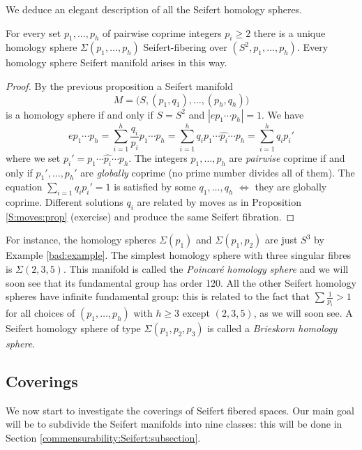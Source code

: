 We deduce an elegant description of all the Seifert homology spheres.

\begin{cor} \label{sigma:cor}
For every set $p_1, \ldots, p_h$ of pairwise coprime integers $p_i\geqslant 2$ there is a unique homology sphere $\Sigma(p_1,\ldots, p_h)$ Seifert-fibering over $(S^2,p_1,\ldots,p_h)$. Every homology sphere Seifert manifold arises in this way.
\end{cor}
\begin{proof}
By the previous proposition a Seifert manifold 
$$M=\big(S,(p_1,q_1), \ldots, (p_h,q_h)\big)$$
is a homology sphere if and only if $S=S^2$ and $|ep_1\cdots p_h|=1$. We have
$$ep_1\cdots p_h = \sum_{i=1}^h \frac{q_i}{p_i}p_1\cdots p_h = \sum_{i=1}^h q_ip_1\cdots \widehat {p_i}\cdots p_h = \sum_{i=1}^h q_ip_i'$$
where we set $p_i' = p_1\cdots \widehat {p_i}\cdots p_h$. The integers $p_1,\ldots, p_h$ are \emph{pairwise} coprime if and only if $p_1',\ldots, p_h'$ are \emph{globally} coprime (no prime number divides all of them). The equation $\sum_{i=1}q_ip_i' = 1$ is satisfied by some $q_1,\ldots, q_h$ $\Longleftrightarrow$ they are globally coprime. Different solutions $q_i$ are related by moves as in Proposition \ref{S:moves:prop} (exercise) and produce the same Seifert fibration.
\end{proof}

For instance, the homology spheres $\Sigma(p_1)$ and $\Sigma(p_1,p_2)$ are just $S^3$ by Example \ref{bad:example}. The simplest homology sphere with three singular fibres is $\Sigma(2,3,5)$. This manifold is called the \emph{Poincar\'e homology sphere} and we will soon see that its fundamental group has order 120. All the other Seifert homology spheres have infinite fundamental group: this is related to the fact that $\sum \frac 1{p_i}>1$ for all choices of $(p_1,\ldots, p_h)$ with $h\geqslant 3$ except $(2,3,5)$, as we will soon see. A Seifert homology sphere of type $\Sigma(p_1,p_2,p_3)$ is called a \emph{Brieskorn homology sphere}.

\subsection{Coverings} 
We now start to investigate the coverings of Seifert fibered spaces. Our main goal will be to subdivide the Seifert manifolds into nine classes: this will be done in Section \ref{commensurability:Seifert:subsection}.


